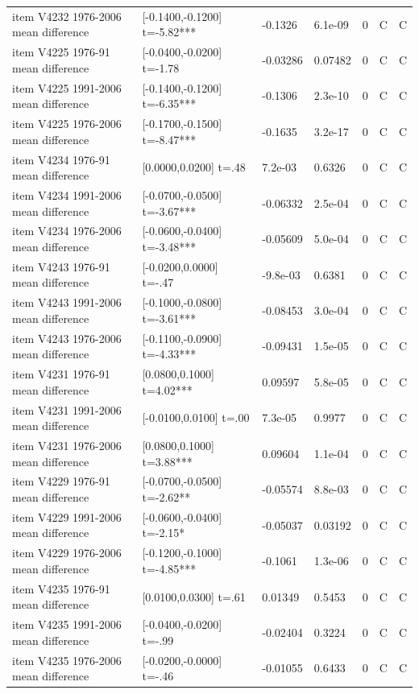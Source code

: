 {\begin{longtable}{@{}p{.245\linewidth}p{.17\linewidth}p{.17\linewidth}p{.085\linewidth}p{.060\linewidth}p{.08\linewidth}p{.07\linewidth}@{}}
item V4232 1976-2006 mean difference & [-0.1400,-0.1200] t=-5.82*** & -0.1326 & 6.1e-09 & 0 & C & C\\
item V4225 1976-91 mean difference & [-0.0400,-0.0200] t=-1.78 & -0.03286 & 0.07482 & 0 & C & C\\
item V4225 1991-2006 mean difference & [-0.1400,-0.1200] t=-6.35*** & -0.1306 & 2.3e-10 & 0 & C & C\\
item V4225 1976-2006 mean difference & [-0.1700,-0.1500] t=-8.47*** & -0.1635 & 3.2e-17 & 0 & C & C\\
item V4234 1976-91 mean difference & [0.0000,0.0200] t=.48 & 7.2e-03 & 0.6326 & 0 & C & C\\
item V4234 1991-2006 mean difference & [-0.0700,-0.0500] t=-3.67*** & -0.06332 & 2.5e-04 & 0 & C & C\\
item V4234 1976-2006 mean difference & [-0.0600,-0.0400] t=-3.48*** & -0.05609 & 5.0e-04 & 0 & C & C\\
item V4243 1976-91 mean difference & [-0.0200,0.0000] t=-.47 & -9.8e-03 & 0.6381 & 0 & C & C\\
item V4243 1991-2006 mean difference & [-0.1000,-0.0800] t=-3.61*** & -0.08453 & 3.0e-04 & 0 & C & C\\
item V4243 1976-2006 mean difference & [-0.1100,-0.0900] t=-4.33*** & -0.09431 & 1.5e-05 & 0 & C & C\\
item V4231 1976-91 mean difference & [0.0800,0.1000] t=4.02*** & 0.09597 & 5.8e-05 & 0 & C & C\\
item V4231 1991-2006 mean difference & [-0.0100,0.0100] t=.00 & 7.3e-05 & 0.9977 & 0 & C & C\\
item V4231 1976-2006 mean difference & [0.0800,0.1000] t=3.88*** & 0.09604 & 1.1e-04 & 0 & C & C\\
item V4229 1976-91 mean difference & [-0.0700,-0.0500] t=-2.62** & -0.05574 & 8.8e-03 & 0 & C & C\\
item V4229 1991-2006 mean difference & [-0.0600,-0.0400] t=-2.15* & -0.05037 & 0.03192 & 0 & C & C\\
item V4229 1976-2006 mean difference & [-0.1200,-0.1000] t=-4.85*** & -0.1061 & 1.3e-06 & 0 & C & C\\
item V4235 1976-91 mean difference & [0.0100,0.0300] t=.61 & 0.01349 & 0.5453 & 0 & C & C\\
item V4235 1991-2006 mean difference & [-0.0400,-0.0200] t=-.99 & -0.02404 & 0.3224 & 0 & C & C\\
item V4235 1976-2006 mean difference & [-0.0200,-0.0000] t=-.46 & -0.01055 & 0.6433 & 0 & C & C\\

\end{longtable}}
